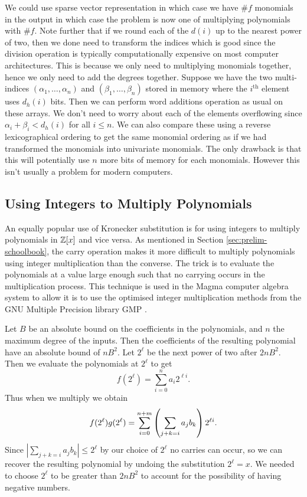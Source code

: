 We could use sparse vector representation in which case we have $\# f$ monomials in the output in which case the problem is now one of multiplying polynomials with $\# f$. Note further that if we round each of the $d(i)$ up to the nearest power of two, then we done need to transform the indices which is good since the division operation is typically computationally expensive on most computer architectures. This is because we only need to multiplying monomials together, hence we only need to add the degrees together. Suppose we have the two multi-indices $(\alpha_1, \ldots, \alpha_n)$ and $(\beta_1, \ldots, \beta_n)$ stored in memory where the $i^{\text{th}}$ element uses $d_h(i)$ bits. Then we can perform word additions operation as usual on these arrays. We don't need to worry about each of the elements overflowing since $\alpha_i + \beta_i < d_h(i)$ for all $i \le n$. We can also compare these using a reverse lexicographical ordering to get the same monomial ordering as if we had transformed the monomials into univariate monomials. The only drawback is that this will potentially use $n$ more bits of memory for each monomials. However this isn't usually a problem for modern computers.

\medskip

\subsection{Using Integers to Multiply Polynomials}%
\label{sub:integers-for-poly-mult}

An equally popular use of Kronecker substitution is for using integers to multiply polynomials in ${\mathbb Z}[x]$ and vice versa. As mentioned in Section \ref{sec:prelim-schoolbook}, the carry operation makes it more difficult to multiply polynomials using integer multiplication than the converse. The trick is to evaluate the polynomials at a value large enough such that no carrying occurs in the multiplication process. This technique is used in the Magma computer algebra system to allow it is to use the optimised integer multiplication methods from the GNU Multiple Precision library GMP \cite{magma}.

Let $B$ be an absolute bound on the coefficients in the polynomials, and $n$ the maximum degree of the inputs. Then the coefficients of the resulting polynomial have an absolute bound of $nB^2$. Let $2^\ell$ be the next power of two after $2nB^2$. Then we evaluate the polynomials at $2^\ell$ to get
\[
    f(2^\ell) = \sum^n_{i = 0} a_i 2^{\ell i}.
\]
Thus when we multiply we obtain
\[
    f(2^\ell)g(2^\ell) = \sum^{n+m}_{i=0} \left(\sum_{j + k = i} a_jb_k\right)2^{\ell i}.
\]
Since $|\sum_{j + k = i}a_j b_k| \leq 2^{\ell}$ by our choice of $2^\ell$ no carries can occur, so we can recover the resulting polynomial by undoing the substitution $2^\ell = x$. We needed to choose $2^\ell$ to be greater than $2nB^2$ to account for the possibility of having negative numbers.


